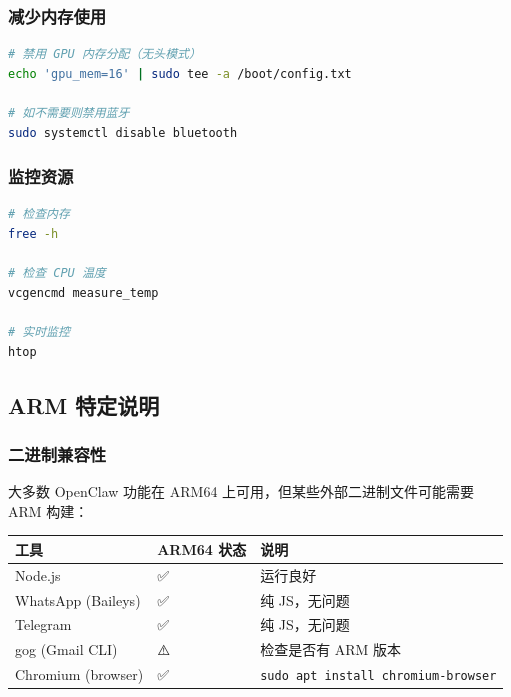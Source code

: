 \subsubsection{减少内存使用}


\begin{lstlisting}[language=bash]
# 禁用 GPU 内存分配（无头模式）
echo 'gpu_mem=16' | sudo tee -a /boot/config.txt

# 如不需要则禁用蓝牙
sudo systemctl disable bluetooth
\end{lstlisting}


\subsubsection{监控资源}


\begin{lstlisting}[language=bash]
# 检查内存
free -h

# 检查 CPU 温度
vcgencmd measure_temp

# 实时监控
htop
\end{lstlisting}


\hrulefill


\subsection{ARM 特定说明}


\subsubsection{二进制兼容性}


大多数 OpenClaw 功能在 ARM64 上可用，但某些外部二进制文件可能需要 ARM 构建：


\begin{table}[h]
\centering
\small
\begin{tabular}{|l|l|l|}
\hline
工具 & ARM64 状态 & 说明 \\
\hline
Node.js & ✅ & 运行良好 \\
\hline
WhatsApp (Baileys) & ✅ & 纯 JS，无问题 \\
\hline
Telegram & ✅ & 纯 JS，无问题 \\
\hline
gog (Gmail CLI) & ⚠️ & 检查是否有 ARM 版本 \\
\hline
Chromium (browser) & ✅ & \texttt{sudo apt install chromium-browser} \\
\hline
\end{tabular}
\end{table}



